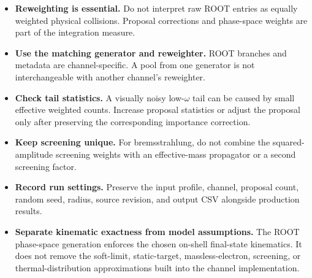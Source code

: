 \documentclass[11pt,a4paper]{article}
\begin{document}
\begin{itemize}
  \item \textbf{Reweighting is essential.} Do not interpret raw ROOT entries as equally weighted physical collisions. Proposal corrections and phase-space weights are part of the integration measure.
  \item \textbf{Use the matching generator and reweighter.} ROOT branches and metadata are channel-specific. A pool from one generator is not interchangeable with another channel's reweighter.
  \item \textbf{Check tail statistics.} A visually noisy low-$\omega$ tail can be caused by small effective weighted counts. Increase proposal statistics or adjust the proposal only after preserving the corresponding importance correction.
  \item \textbf{Keep screening unique.} For bremsstrahlung, do not combine the squared-amplitude screening weights with an effective-mass propagator or a second screening factor.
  \item \textbf{Record run settings.} Preserve the input profile, channel, proposal count, random seed, radius, source revision, and output CSV alongside production results.
  \item \textbf{Separate kinematic exactness from model assumptions.} The ROOT phase-space generation enforces the chosen on-shell final-state kinematics. It does not remove the soft-limit, static-target, massless-electron, screening, or thermal-distribution approximations built into the channel implementation.
\end{itemize}
\end{document}
